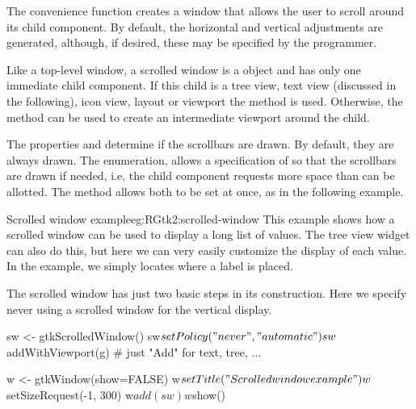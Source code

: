 The convenience function  creates a
window that allows the user to scroll around its  child component. By
default, the horizontal and vertical adjustments are generated,
although, if desired, these
may be specified by the programmer.

Like a top-level window, a scrolled window is a  object
and has only one immediate child component. If this child is a tree
view, text view (discussed in the following), icon view, layout or
viewport the  method is used. Otherwise, the
method  can be used to create an
intermediate viewport around the child.


The properties  and 
determine if the scrollbars are drawn. By default, they are always
drawn. The  enumeration, allows a specification of
 so that the scrollbars are drawn if needed, i.e, the
child component requests more space than can be allotted. The
 method allows both to be set at
once, as in the following example.

\begin{example}{Scrolled window example}{eg:RGtk2:scrolled-window}
This example shows how a scrolled window can be used to display a long list of values. The tree view
widget can also do this, but here we can very easily customize the display of each value. In the example, we simply locates where a label is placed.


\begin{Schunk}
\end{Schunk}

The scrolled window has just two basic steps in its construction. Here
we specify never using a scrolled window for the vertical display.
\begin{Schunk}
\begin{Sinput}
 sw <- gtkScrolledWindow()
 sw$setPolicy("never","automatic")
 sw$addWithViewport(g)                   # just "Add" for text, tree, ...
\end{Sinput}
\end{Schunk}

\begin{Schunk}
\begin{Sinput}
 w <- gtkWindow(show=FALSE)
 w$setTitle("Scrolled window example")
 w$setSizeRequest(-1, 300)
 w$add(sw)
 w$show()
\end{Sinput}
\end{Schunk}
\end{example}


